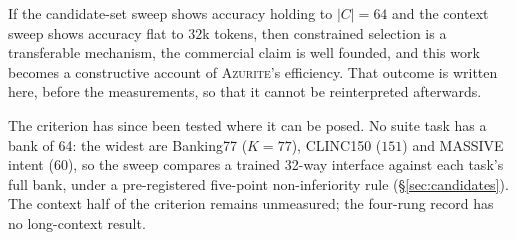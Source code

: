 If the candidate-set sweep shows accuracy holding to $|C| = 64$ and the context
sweep shows accuracy flat to $32$k tokens, then constrained selection is a
transferable mechanism, the commercial claim is well founded, and this work becomes
a constructive account of \textsc{Azurite}'s efficiency. That outcome is written
here, before the measurements, so that it cannot be reinterpreted afterwards.

The criterion has since been tested where it can be posed. No suite task has a
bank of 64: the widest are Banking77 ($K=77$), CLINC150 ($151$) and MASSIVE intent
($60$), so the sweep compares a trained 32-way interface against each task's full
bank, under a pre-registered five-point non-inferiority rule
(\S\ref{sec:candidates}). The context half of the criterion remains unmeasured;
the four-rung record has no long-context result.
